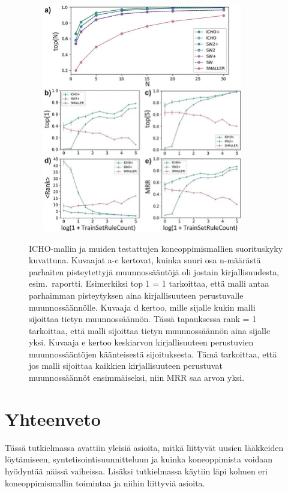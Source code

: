 \documentclass[finnish,twoside,censored,tkt,sw-line]{HYthesisML}
\begin{document}
\begin{figure}[!ht]
    \centering
    \includegraphics[width=10cm, height=10cm]{icho-performance-fig.jpg}
    \caption{
        ICHO-mallin ja muiden testattujen koneoppimismallien suorituskyky kuvattuna.
        Kuvaajat a-c kertovat, kuinka suuri osa n-määrästä parhaiten pisteytettyjä muunnossääntöjä oli jostain kirjallisuudesta, esim.\ raportti.
        Esimerkiksi top 1 = 1 tarkoittaa, että malli antaa parhaimman pisteytyksen aina kirjallisuuteen perustuvalle muunnossäännölle.
        Kuvaaja d kertoo, mille sijalle kukin malli sijoittaa tietyn muunnossäännön.
        Tässä tapauksessa rank = 1 tarkoittaa, että malli sijoittaa tietyn muunnossäännön aina sijalle yksi.
        Kuvaaja e kertoo keskiarvon kirjallisuuteen perustuvien muunnossääntöjen käänteisestä sijoituksesta.
        Tämä tarkoittaa, että jos malli sijoittaa kaikkien kirjallisuuteen perustuvat muunnossäännöt ensimmäiseksi, niin MRR saa arvon yksi.
    }
    {\cite{ExpertKnowledgeRetorsynthesis}}
    {\label{fig:icho-performance}}
\end{figure}

\chapter{Yhteenveto}

Tässä tutkielmassa avattiin yleisiä asioita, mitkä liittyvät uusien lääkkeiden löytämiseen, syntetisointisuunnitteluun ja kuinka koneoppimista voidaan hyödyntää näissä vaiheissa.
Lisäksi tutkielmassa käytiin läpi kolmen eri koneoppimismallin toimintaa ja niihin liittyviä asioita.
\end{document}
